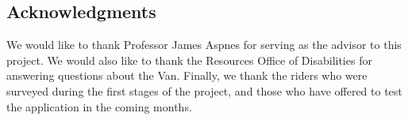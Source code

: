 \documentclass[12pt, a4paper]{article}
\begin{document}
\begin{multicols*}{2}
\section{Acknowledgments}
We would like to thank Professor James Aspnes for serving as the advisor to this project. We would also like to thank the Resources Office of Disabilities for answering questions about the Van. Finally, we thank the riders who were surveyed during the first stages of the project, and those who have offered to test the application in the coming months.
\end{multicols*}
\end{document}
